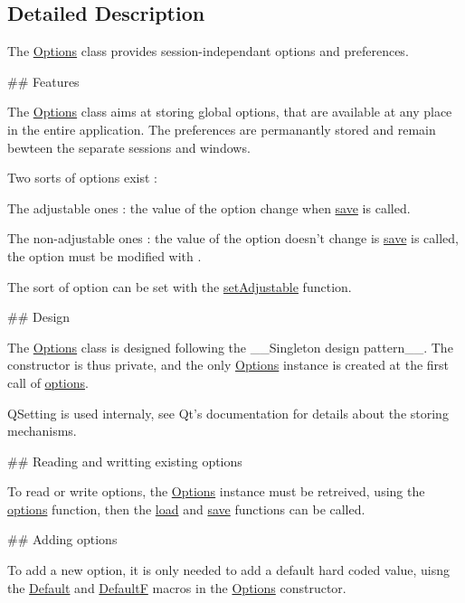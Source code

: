 \subsection{\-Detailed \-Description}
\-The \hyperlink{struct_options}{\-Options} class provides session-\/independant options and preferences. 

\#\# \-Features

\-The \hyperlink{struct_options}{\-Options} class aims at storing global options, that are available at any place in the entire application. \-The preferences are permanantly stored and remain bewteen the separate sessions and windows.

\-Two sorts of options exist \-:
\begin{DoxyItemize}
\item \-The adjustable ones \-: the value of the option change when \hyperlink{struct_options_ad20146ff9544f6229bb1696ea5bf643d}{save} is called.
\item \-The non-\/adjustable ones \-: the value of the option doesn't change is \hyperlink{struct_options_ad20146ff9544f6229bb1696ea5bf643d}{save} is called, the option must be modified with .
\end{DoxyItemize}

\-The sort of option can be set with the \hyperlink{struct_options_a086db8fe7688ddcb3b74db85262a5ba0}{set\-Adjustable} function.

\#\# \-Design

\-The \hyperlink{struct_options}{\-Options} class is designed following the \-\_\-\-\_\-\-Singleton design pattern\-\_\-\-\_\-. \-The constructor is thus private, and the only \hyperlink{struct_options}{\-Options} instance is created at the first call of \hyperlink{struct_options_aa3dd7609fbc5d54af65992632bff842a}{options}.

\-Q\-Setting is used internaly, see \-Qt's documentation for details about the storing mechanisms.

\#\# \-Reading and writting existing options

\-To read or write options, the \hyperlink{struct_options}{\-Options} instance must be retreived, using the \hyperlink{struct_options_aa3dd7609fbc5d54af65992632bff842a}{options} function, then the \hyperlink{struct_options_ada32d485296bd6ba73a1d95bd6260c1a}{load} and \hyperlink{struct_options_ad20146ff9544f6229bb1696ea5bf643d}{save} functions can be called.

\#\# \-Adding options

\-To add a new option, it is only needed to add a default hard coded value, uisng the \hyperlink{options_8h_a37c44b1e71afed084dbe855181c444e2}{\-Default} and \hyperlink{options_8h_a39f3ee28f306ee663a9985433ef2d01c}{\-Default\-F} macros in the \hyperlink{struct_options}{\-Options} constructor.

